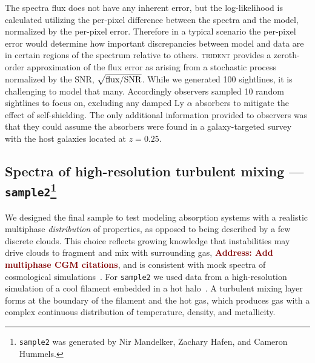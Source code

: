 \documentclass[fleqn,usenatbib]{mnras}
\newcommand{\todo}[1]{\textcolor{Maroon}{\textbf{Address: #1}}}
\begin{document}
The spectra flux does not have any inherent error, but the log-likelihood is calculated utilizing the per-pixel difference between the spectra and the model, normalized by the per-pixel error.
Therefore in a typical scenario the per-pixel error would determine how important discrepancies between model and data are in certain regions of the spectrum relative to others.
\textsc{trident} provides a zeroth-order approximation of the flux error as arising from a stochastic process normalized by the SNR, $\sqrt{{\rm flux}/{\rm SNR}}$.
While we generated 100 sightlines, it is challenging to model that many.
Accordingly observers sampled 10 random sightlines to focus on, excluding any damped Ly $\alpha$ absorbers to mitigate the effect of self-shielding.
The only additional information provided to observers was that they could assume the absorbers were found in a galaxy-targeted survey with the host galaxies located at $z=0.25$.

\subsection[Spectra of high-resolution turbulent mixing --- \texttt{sample2}]{Spectra of high-resolution turbulent mixing --- \texttt{sample2}\footnote{
\texttt{sample2} was generated by Nir Mandelker, Zachary Hafen, and Cameron Hummels.}}
\label{s: data generation -- sample2}

We designed the final sample to test modeling absorption systems with a realistic multiphase \textit{distribution} of properties, as opposed to being described by a few discrete clouds.
This choice reflects growing knowledge that instabilities may drive clouds to fragment and mix with surrounding gas, \todo{Add multiphase CGM citations}, and is consistent with mock spectra of cosmological simulations~\citep[e.g.][]{Marra2022}.
For \texttt{sample2} we used data from a high-resolution simulation of a cool filament embedded in a hot halo~\citep{Mandelker2020a}.
A turbulent mixing layer forms at the boundary of the filament and the hot gas, which produces gas with a complex continuous distribution of temperature, density, and metallicity.
\end{document}
